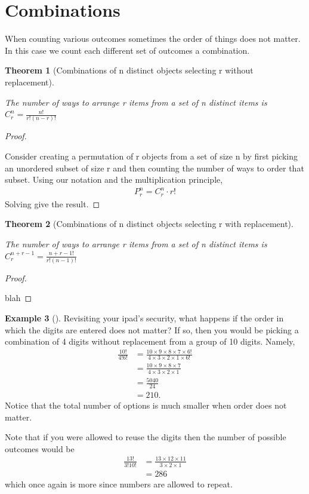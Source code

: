 \documentclass[10pt,]{book}
\theoremstyle{plain}
\newtheorem{theorem}{Theorem}[section]
\theoremstyle{definition}
\theoremstyle{definition}
\newtheorem{example}[theorem]{Example}
\numberwithin{equation}{section}
\begin{document}
\section[Combinations]{Combinations}\label{section-11}
When counting various outcomes sometimes the order of things does not matter.
In this case we count each different set of outcomes a combination. %
\begin{theorem}[Combinations of n distinct objects selecting r without replacement]\label{theorem-12}

			The number of ways to arrange r items from a set of n distinct items 
			is \( C_r^n = \frac{n!}{r!(n-r)!} \)
\end{theorem}
\begin{proof}\hypertarget{proof-8}{}

			Consider creating a permutation of r objects from a set of size n
			by first picking an unordered subset of size r and then counting 
			the number of ways to order that subset. Using our notation and the
			multiplication principle,
			\begin{gather*}
P_r^n = C_r^n \cdot r!
\end{gather*}
			Solving give the result.
\end{proof}
\begin{theorem}[Combinations of n distinct objects selecting r with replacement]\label{theorem-13}

			The number of ways to arrange r items from a set of n distinct items 
			is \( C_r^{n+r-1} = \frac{n+r-1!}{r!(n-1)!} \)
\end{theorem}
\begin{proof}\hypertarget{proof-9}{}

			blah
\end{proof}
\begin{example}[]\label{example-9}
Revisiting your ipad's security, what happens if the order in which the digits are entered does not matter? If so, then you would be picking a combination of 4 digits without replacement from a group of 10 digits. Namely, 
		\begin{align*}
\frac{10!}{4!6!} & = \frac{10 \times 9 \times 8 \times 7 \times 6!}{4 \times 3 \times 2 \times 1 \times 6!}\\
& = \frac{10 \times 9 \times 8 \times 7}{4 \times 3 \times 2 \times 1}\\
& = \frac{5040}{24}\\
& = 210.
\end{align*}
		Notice that the total number of options is much smaller when order does not matter.
\par

		Note that if you were allowed to reuse the digits then the number of possible outcomes would be
		\begin{align*}
\frac{13!}{3!10!} & = \frac{13 \times 12 \times 11}{3 \times 2 \times 1} \\
 & = 286
\end{align*}
		which once again is more since numbers are allowed to repeat.
\end{example}
\end{document}
